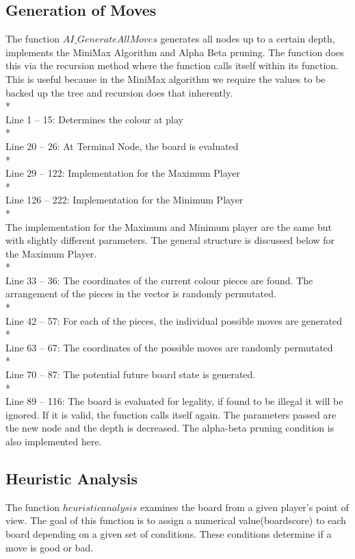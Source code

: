 \documentclass[11pt,a4paper]{article}
\begin{document}
\subsection{Generation of Moves}
\indent\indent The function $AI\_GenerateAllMoves$ generates all nodes up to a certain depth, implements the MiniMax Algorithm and Alpha Beta pruning. The function does this via the recursion method where the function calls itself within its function. This is useful because in the MiniMax algorithm we require the values to be backed up the tree and recursion does that inherently.
\\*\\
Line 1 – 15: Determines the colour at play
\\*\\
Line 20 – 26: At Terminal Node, the board is evaluated
\\*\\
Line 29 – 122: Implementation for the Maximum Player
\\*\\
Line 126 – 222: Implementation for the Minimum Player\newline
\\*\\
\indent The implementation for the Maximum and Minimum player are the same but with slightly different parameters. The general structure is discussed below for the Maximum Player.
\\*\\
Line 33 – 36: The coordinates of the current colour pieces are found. The arrangement of the pieces in the vector is randomly permutated.
\\*\\
Line 42 – 57: For each of the pieces, the individual possible moves are generated
\\*\\
Line 63 – 67: The coordinates of the possible moves are randomly permutated
\\*\\
Line 70 – 87: The potential future board state is generated.
\\*\\
Line 89 – 116: The board is evaluated for legality, if found to be illegal it will be ignored. If it is valid, the function calls itself again. The parameters passed are the new node and the depth is decreased. The alpha-beta pruning condition is also implemented here.

\subsection{Heuristic Analysis}
\indent\indent The function $heuristicanalysis$ examines the board from a given player’s point of view. The goal of this function is to assign a numerical value(boardscore) to each board depending on a given set of conditions. These conditions determine if a move is good or bad.\cite{chess6}\cite{chess7}
\end{document}

